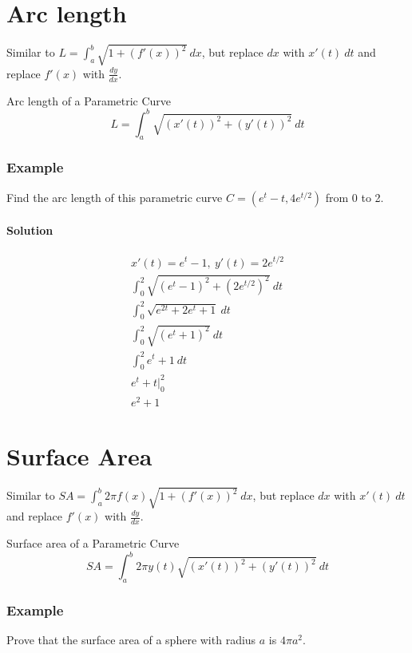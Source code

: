 \documentclass[./MATH-115-Notes.tex]{subfiles}
\begin{document}
\section{Arc length}
Similar to $ L = \int_a^b \sqrt{1 + (f'(x))^2}\ dx $, but replace $dx$ with $ x'(t)\ dt $ and replace $ f'(x) $ with $ \frac{dy}{dx} $.
\begin{paperbox}{Arc length of a Parametric Curve}
    \begin{equation}
        L = \int_a^b \sqrt{(x'(t))^2+(y'(t))^2}\ dt
    \end{equation}
\end{paperbox}
\subsubsection{Example}
Find the arc length of this parametric curve $ C = (e^t-t, 4e^{t/2}) $ from 0 to 2. 
\paragraph{Solution}
\begin{gather*}
    x'(t) = e^t - 1,\ y'(t) = 2e^{t/2}\\
    \int_0^2 \sqrt{(e^t - 1)^2+(2e^{t/2})^2}\ dt\\
    \int_0^2 \sqrt{e^{2t} + 2e^t + 1}\ dt\\
    \int_0^2 \sqrt{(e^t + 1)^2}\ dt\\
    \int_0^2 e^t + 1\ dt\\
    e^t + t \biggl|_0^2\\
    e^2 + 1
\end{gather*}
\newpage

\section{Surface Area}
Similar to $ SA = \int_a^b 2\pi f(x) \sqrt{1 + (f'(x))^2}\ dx $, but replace $dx$ with $ x'(t)\ dt $ and replace $ f'(x) $ with $ \frac{dy}{dx} $.
\begin{paperbox}{Surface area of a Parametric Curve}
    \begin{equation}
        SA = \int_a^b 2\pi y(t) \sqrt{(x'(t))^2+(y'(t))^2}\ dt
    \end{equation}
\end{paperbox}
\subsubsection{Example}
Prove that the surface area of a sphere with radius $a$ is $ 4\pi a^2 $.
\end{document}
